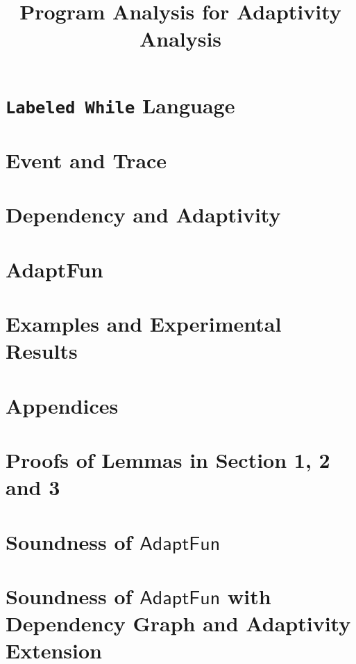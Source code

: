 \documentclass[a4paper,11pt]{article}
\newcommand{\highlight}[1]{\textcolor[rgb]{.0,0.0,1.0}{ #1}}
\newcommand{\THESYSTEM}{\textsf{AdaptFun}}
\begin{document}
\title{Program Analysis for Adaptivity Analysis}

\author{}

\date{}

\maketitle
%
\tableofcontents

% 
\section{{\tt Labeled While} Language}

\clearpage
\section{Event and Trace}


\clearpage
\section{\highlight{Dependency and Adaptivity}}


% 
\clearpage
\section{\THESYSTEM}
\label{sec:adpfun}



\clearpage
%
\section{Examples and Experimental Results}


%
\clearpage
\appendix
{}
\section*{Appendices}
\section{Proofs of Lemmas in Section 1, 2 and 3}
\label{apdx:lemma_sec123}

\clearpage
\section{Soundness of $\THESYSTEM$ }
\label{apdx:adapt_soundness}

\clearpage
\section{Soundness of $\THESYSTEM$ \highlight{with Dependency Graph and Adaptivity Extension} }
\label{apdx:adapt_soundness_extend}

\clearpage
\end{document}
